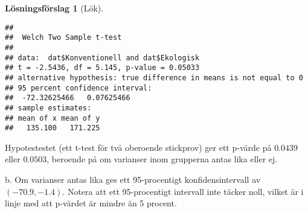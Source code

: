 \documentclass[
]{book}
\newenvironment{Shaded}{\begin{snugshade}}{\end{snugshade}}
\newcommand{\AttributeTok}[1]{\textcolor[rgb]{0.77,0.63,0.00}{#1}}
\newcommand{\FunctionTok}[1]{\textcolor[rgb]{0.00,0.00,0.00}{#1}}
\newcommand{\NormalTok}[1]{#1}
\newcommand{\SpecialCharTok}[1]{\textcolor[rgb]{0.00,0.00,0.00}{#1}}
\theoremstyle{definition}
\theoremstyle{definition}
\theoremstyle{definition}
\theoremstyle{definition}
\newtheorem{hypothesis}{Lösningsförslag}[chapter]
\theoremstyle{remark}
\begin{document}
\begin{hypothesis}[Lök]
\begin{Shaded}
\end{Shaded}

\begin{verbatim}
## 
##  Welch Two Sample t-test
## 
## data:  dat$Konventionell and dat$Ekologisk
## t = -2.5436, df = 5.145, p-value = 0.05033
## alternative hypothesis: true difference in means is not equal to 0
## 95 percent confidence interval:
##  -72.32625466   0.07625466
## sample estimates:
## mean of x mean of y 
##   135.100   171.225
\end{verbatim}

Hypotestestet (ett t-test för två oberoende stickprov) ger ett p-värde på \(0.0439\) eller \(0.0503\), beroende på om varianser inom grupperna antas lika eller ej.

b. Om varianser antas lika ges ett 95-procentigt konfidensintervall av \((-70.9, -1.4)\). Notera att ett 95-procentigt intervall inte täcker noll, vilket är i linje med att p-värdet är mindre än 5 procent.
\end{hypothesis}
\end{document}

